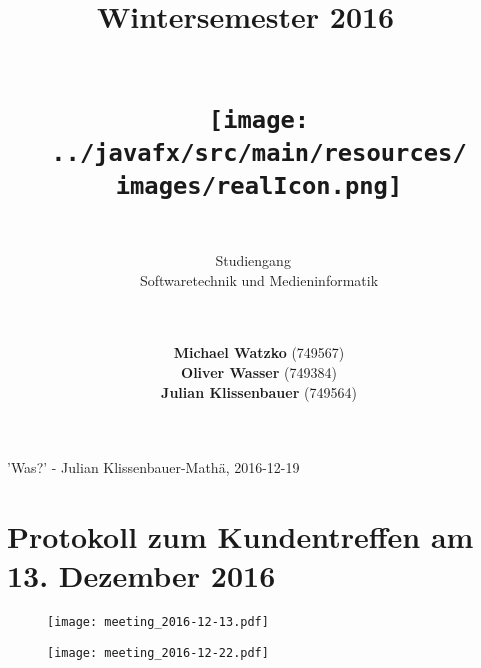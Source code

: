 \documentclass[12pt]{scrartcl}
\title{
	~\\ ~\\
	\labtitle
	~\\ ~\\
		\LARGE \textnormal{
     	\lab
	~\\ Wintersemester 2016 ~\\ ~\\
	}
	\begin{figure}[h!]
		\centering
		\texttt{[image: ../javafx/src/main/resources/images/realIcon.png]}
	\end{figure}
}
\subtitle{
\Large \textnormal{
~\\
	Studiengang ~\\
	Softwaretechnik und Medieninformatik \\
~\\
	~\\ \large %
	}
}
\author{
	\large \textbf{Michael Watzko} (749567) \\
	\large \textbf{Oliver Wasser} (749384) \\
	\large \textbf{Julian Klissenbauer} (749564)
}
\date{}
\newcommand{\textMeetingFirst}{Protokoll zum Kundentreffen am 13. Dezember 2016}
\begin{document}
	\maketitle
	\clearpage
	'Was?' - Julian Klissenbauer-Mathä, 2016-12-19	
	\clearpage
	\tableofcontents
	
	\clearpage
	

	\clearpage
		
	
	\clearpage
	
	
	\clearpage
	
	
	\clearpage
	
	
	\clearpage
	
	
	\clearpage
	
	
	\clearpage
	
	
	
	\clearpage
	\section{\textMeetingFirst}
	\label{\textMeetingFirst}
	\begin{figure}[h!]
		\centering
		\texttt{[image: meeting\_2016-12-13.pdf]}
	\end{figure}
	
	\begin{figure}[h!]
		\centering
		\texttt{[image: meeting\_2016-12-22.pdf]}
	\end{figure}  
	
	\clearpage
	\listoffigures
	
	\clearpage
	\printbibliography[heading=bibintoc]
\end{document}
